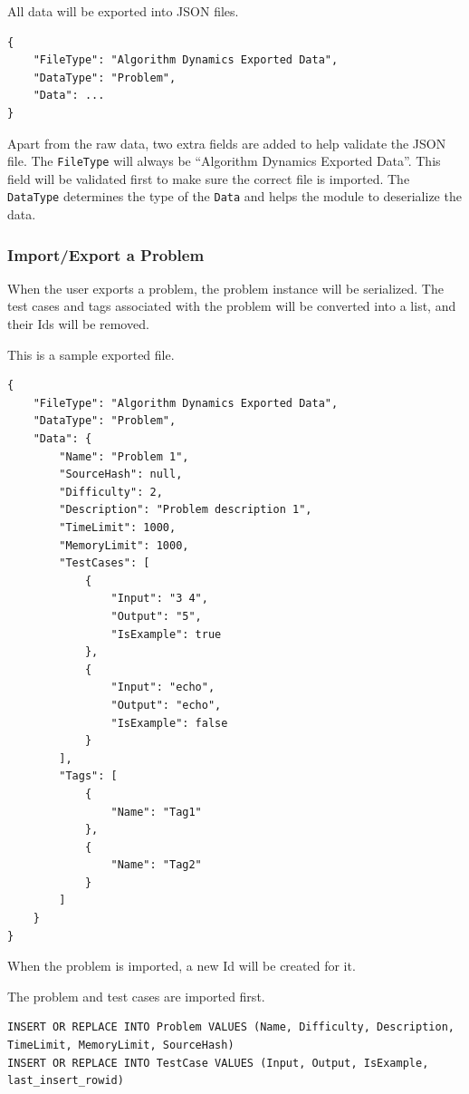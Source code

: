 \documentclass[a4paper]{report}
\begin{document}
All data will be exported into JSON files.

\begin{verbatim}
{
    "FileType": "Algorithm Dynamics Exported Data",
    "DataType": "Problem",
    "Data": ...
}
\end{verbatim}

Apart from the raw data, two extra fields are added to help validate the JSON file. The \verb|FileType| will always be ``Algorithm Dynamics Exported Data''. This field will be validated first to make sure the correct file is imported. The \verb|DataType| determines the type of the \verb|Data| and helps the module to deserialize the data.

\subsubsection{Import/Export a Problem}

When the user exports a problem, the problem instance will be serialized. The test cases and tags associated with the problem will be converted into a list, and their Ids will be removed.

This is a sample exported file.

\begin{verbatim}
{
    "FileType": "Algorithm Dynamics Exported Data",
    "DataType": "Problem",
    "Data": {
        "Name": "Problem 1",
        "SourceHash": null,
        "Difficulty": 2,
        "Description": "Problem description 1",
        "TimeLimit": 1000,
        "MemoryLimit": 1000,
        "TestCases": [
            {
                "Input": "3 4",
                "Output": "5",
                "IsExample": true
            },
            {
                "Input": "echo",
                "Output": "echo",
                "IsExample": false
            }
        ],
        "Tags": [
            {
                "Name": "Tag1"
            },
            {
                "Name": "Tag2"
            }
        ]
    }
}
\end{verbatim}

When the problem is imported, a new Id will be created for it.

The problem and test cases are imported first.

\begin{verbatim}
INSERT OR REPLACE INTO Problem VALUES (Name, Difficulty, Description, TimeLimit, MemoryLimit, SourceHash)
INSERT OR REPLACE INTO TestCase VALUES (Input, Output, IsExample, last_insert_rowid)
\end{verbatim}
\end{document}
